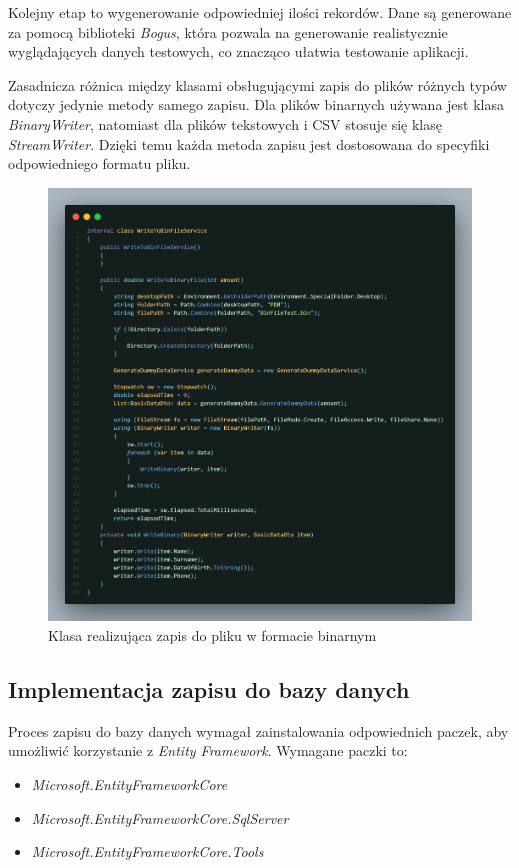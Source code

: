 \documentclass{report}
\begin{document}
Kolejny etap to wygenerowanie odpowiedniej ilości rekordów. Dane są generowane za pomocą biblioteki \textit{Bogus}, która pozwala na generowanie realistycznie wyglądających danych testowych, co znacząco ułatwia testowanie aplikacji.

Zasadnicza różnica między klasami obsługującymi zapis do plików różnych typów dotyczy jedynie metody samego zapisu. Dla plików binarnych używana jest klasa \textit{BinaryWriter}, natomiast dla plików tekstowych i CSV stosuje się klasę \textit{StreamWriter}. Dzięki temu każda metoda zapisu jest dostosowana do specyfiki odpowiedniego formatu pliku.

\begin{figure}
    \centering
    \includegraphics[width=1.0\textwidth]{src/write-bin.png}
    \caption{Klasa realizująca zapis do pliku w formacie binarnym}
\end{figure}

\subsection{\Large Implementacja zapisu do bazy danych}

Proces zapisu do bazy danych wymagał zainstalowania odpowiednich paczek, aby umożliwić korzystanie z \textit{Entity Framework}. Wymagane paczki to: 
\begin{itemize} 
    \item \textit{Microsoft.EntityFrameworkCore} 
    \item \textit{Microsoft.EntityFrameworkCore.SqlServer} 
    \item \textit{Microsoft.EntityFrameworkCore.Tools} 
\end{itemize}
\end{document}
